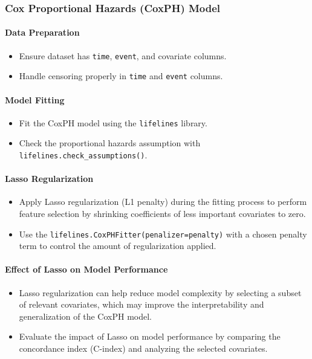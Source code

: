 \subsubsection*{Cox Proportional Hazards (CoxPH) Model}

\paragraph*{Data Preparation}
\begin{itemize}
    \item Ensure dataset has \texttt{time}, \texttt{event}, and covariate columns.
    \item Handle censoring properly in \texttt{time} and \texttt{event} columns.
\end{itemize}

\paragraph*{Model Fitting}
\begin{itemize}
    \item Fit the CoxPH model using the \texttt{lifelines} library.
    \item Check the proportional hazards assumption with \texttt{lifelines.check\_assumptions()}.
\end{itemize}

\paragraph*{Lasso Regularization}
\begin{itemize}
    \item Apply Lasso regularization (L1 penalty) during the fitting process to perform feature selection by shrinking coefficients of less important covariates to zero.
    \item Use the \texttt{lifelines.CoxPHFitter(penalizer=penalty)} with a chosen penalty term to control the amount of regularization applied.
\end{itemize}

\paragraph*{Effect of Lasso on Model Performance}
\begin{itemize}
    \item Lasso regularization can help reduce model complexity by selecting a subset of relevant covariates, which may improve the interpretability and generalization of the CoxPH model.
    \item Evaluate the impact of Lasso on model performance by comparing the concordance index (C-index) and analyzing the selected covariates.
\end{itemize}


